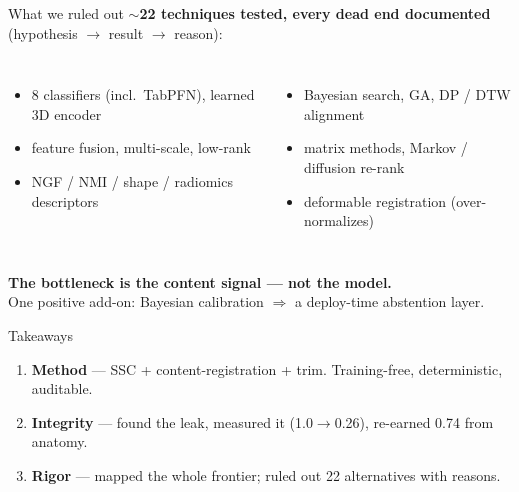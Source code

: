 \documentclass[aspectratio=169,11pt]{beamer}
\begin{document}
\begin{frame}{What we ruled out}
  \textbf{$\sim$22 techniques tested, every dead end documented} (hypothesis $\to$ result $\to$ reason):
  \begin{columns}[t]
    \footnotesize
      \begin{itemize}
        \item 8 classifiers (incl.\ TabPFN), learned 3D encoder
        \item feature fusion, multi-scale, low-rank
        \item NGF / NMI / shape / radiomics descriptors
      \end{itemize}
    \footnotesize
      \begin{itemize}
        \item Bayesian search, GA, DP / DTW alignment
        \item matrix methods, Markov / diffusion re-rank
        \item deformable registration (over-normalizes)
      \end{itemize}
  \end{columns}
  \vfill
  \begin{center}
    \textbf{\color{acc}The bottleneck is the content signal — not the model.}\\[1mm]
    \footnotesize One positive add-on: Bayesian calibration $\Rightarrow$ a deploy-time abstention layer.
  \end{center}
\end{frame}

\begin{frame}[standout]{Takeaways}
  \begin{enumerate}
    \item \textbf{Method} — SSC + content-registration + trim. Training-free, deterministic, auditable.
    \item \textbf{Integrity} — found the leak, measured it (1.0$\to$0.26), re-earned 0.74 from anatomy.
    \item \textbf{Rigor} — mapped the whole frontier; ruled out 22 alternatives with reasons.
  \end{enumerate}
\end{frame}
\end{document}
